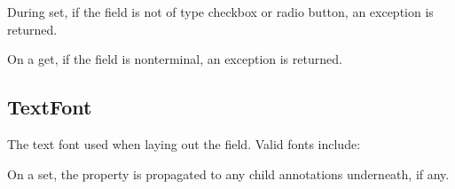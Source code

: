 \documentclass[letterpaper,12pt,english,openany,oneside]{sphinxmanual}
\begin{document}
During set, if the field is not of type checkbox or radio button, an exception  is returned.

On a get, if the field is non\sphinxhyphen{}terminal, an exception  is returned.

\label{\detokenize{IAC_API_FormsIntro:example-17}}

\begin{sphinxVerbatim}[commandchars=\\\{\}]
  
\end{sphinxVerbatim}




\subsection{TextFont}
\label{\detokenize{IAC_API_FormsIntro:textfont}}
The text font used when laying out the field. Valid fonts include:

\begin{sphinxVerbatim}[commandchars=\\\{\}]
\end{sphinxVerbatim}

On a set, the property is propagated to any child annotations underneath, if any.

\label{\detokenize{IAC_API_FormsIntro:syntax-29}}

\begin{sphinxVerbatim}[commandchars=\\\{\}]
\PYG{p}{[}\PYG{p}{]} 
\end{sphinxVerbatim}
\label{\detokenize{IAC_API_FormsIntro:example-18}}
\end{document}
